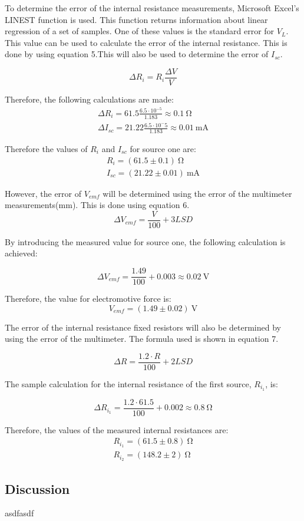 \documentclass[a4paper]{article}
\newcommand{\unit}[1]{~\mathrm{#1}}
\begin{document}
To determine the error of the internal resistance measurements, Microsoft
Excel's LINEST function is used. This function returns information about linear
regression of a set of samples. One of these values is the standard error for
$V_{L}$. This value can be used to calculate the error of the internal
resistance. This is done by using equation 5.This will also be used to determine the error of $I_{sc}$. 

\begin{equation}
    \Delta R_i = R_i \frac{\Delta V}{V}
\end{equation}

Therefore, the following calculations are made:
\begin{gather*}
    \Delta R_i = 61.5 \frac{6.5 \cdot 10^{-5}}{1.183} \approx 0.1\unit{\Omega}\\
    \Delta I_{sc} = 21.22 \frac{6.5\cdot 10^-5}{1.183} \approx 0.01\unit{mA}
\end{gather*}

Therefore the values of $R_i$ and $I_{sc}$ for source one are:
\begin{gather*}
    R_i = (61.5\pm 0.1)\unit{\Omega}\\
    I_{sc} = (21.22 \pm 0.01)\unit{mA}
\end{gather*}

However, the error of $V_{emf}$ will be determined using the error of the
multimeter measurements(mm). This is done using equation 6.
\begin{equation}
    \Delta V_{emf} = \frac{V}{100} + 3 LSD
\end{equation}

By introducing the measured value for source one, the following calculation is
achieved:

\[ \Delta V_{emf} = \frac{1.49}{100} + 0.003 \approx 0.02 \unit{V}\]

Therefore, the value for electromotive force is:
\[V_{emf} = (1.49 \pm 0.02)\unit{V}\]

The error of the internal resistance fixed resistors will also be determined by
using the error of the multimeter. The formula used is shown in equation 7.

\begin{equation}
    \Delta R = \frac{1.2 \cdot R}{100} + 2LSD
\end{equation}

The sample calculation for the internal resistance of the first source, $R_{i_1}$, is:

\[\Delta R_{i_1} = \frac{1.2 \cdot 61.5}{100} + 0.002 \approx 0.8\unit{\Omega}\]

Therefore, the values of the measured internal resistances are:
\begin{gather*}
    R_{i_1} = (61.5 \pm 0.8)\unit{\Omega}\\
    R_{i_2} = (148.2 \pm 2)\unit{\Omega}
\end{gather*}

\subsection{Discussion}
asdfasdf
\end{document}

